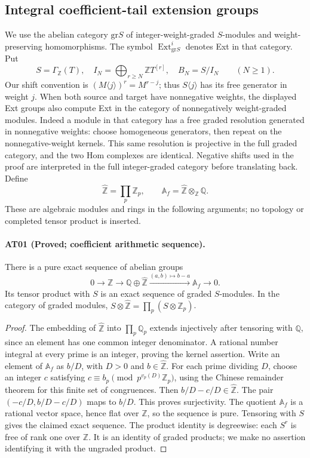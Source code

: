 \subsection{Integral coefficient-tail extension groups}

We use the abelian category $\mathrm{gr}S$ of integer-weight-graded
$S$-modules and weight-preserving homomorphisms. The symbol
$\operatorname{Ext}^i_{\mathrm{gr}S}$ denotes Ext in that category.
Put
\[
 S=\Gamma_{\mathbb Z}(T),\quad
 I_N=\bigoplus_{r\geq N}\mathbb ZT^{[r]},\quad B_N=S/I_N
 \qquad(N\geq1).
\]
Our shift convention is $(M\langle j\rangle)^r=M^{r-j}$;
thus $S\langle j\rangle$ has its free generator in weight $j$.
When both source and target have nonnegative weights, the
displayed Ext groups also compute Ext in the category of
nonnegatively weight-graded modules. Indeed a module in that
category has a free graded resolution generated in nonnegative
weights: choose homogeneous generators, then repeat on the
nonnegative-weight kernels. This same resolution is projective
in the full graded category, and the two Hom complexes are
identical. Negative shifts used in the proof are interpreted
in the full integer-graded category before translating back.
Define
\[
 \widehat{\mathbb Z}=\prod_p\mathbb Z_p,
 \qquad \mathbb A_f=\widehat{\mathbb Z}\otimes_{\mathbb Z}\mathbb Q.
\]
These are algebraic modules and rings in the following arguments;
no topology or completed tensor product is inserted.

\paragraph{AT01 (Proved; coefficient arithmetic sequence).}
There is a pure exact sequence of abelian groups
\[
 0\longrightarrow\mathbb Z\longrightarrow
 \mathbb Q\oplus\widehat{\mathbb Z}
 \xrightarrow{(a,b)\mapsto b-a}\mathbb A_f\longrightarrow0.
\]
Its tensor product with $S$ is an exact sequence of graded
$S$-modules. In the category of graded modules,
$S\otimes\widehat{\mathbb Z}=\prod_p(S\otimes\mathbb Z_p)$.

\begin{proof}
The embedding of $\widehat{\mathbb Z}$ into $\prod_p\mathbb Q_p$
extends injectively after tensoring with $\mathbb Q$, since an
element has one common integer denominator. A rational number
integral at every prime is an integer, proving the kernel
assertion. Write an element of $\mathbb A_f$ as $b/D$, with
$D>0$ and $b\in\widehat{\mathbb Z}$. For each prime dividing
$D$, choose an integer $c$ satisfying
$c\equiv b_p\pmod{p^{v_p(D)}\mathbb Z_p}$, using the Chinese
remainder theorem for this finite set of congruences. Then
$b/D-c/D\in\widehat{\mathbb Z}$. The pair
$(-c/D,b/D-c/D)$ maps to $b/D$. This proves surjectivity.
The quotient $\mathbb A_f$ is a rational vector space, hence
flat over $\mathbb Z$, so the sequence is pure. Tensoring
with $S$ gives the claimed exact sequence. The product
identity is degreewise: each $S^r$ is free of rank one over
$\mathbb Z$. It is an identity of graded products; we make
no assertion identifying it with the ungraded product.
\end{proof}


